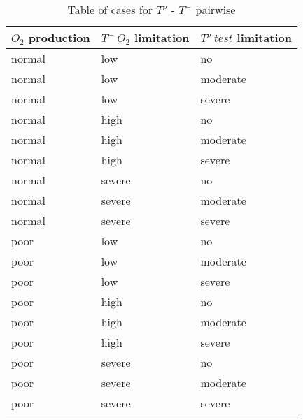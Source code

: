 \begin{table}
  \centering
  \begin{tabular}{|l|l|l|}
    \hline
    \textbf{$O_2$ production} & \textbf{$T^-\ O_2$ limitation} & \textbf{$T^p\ test$ limitation}\\ \hline
    normal & low & no \\ \hline
    normal & low & moderate \\ \hline
    normal & low & severe \\ \hline
    normal & high & no \\ \hline
    normal & high & moderate \\ \hline
    normal & high & severe \\ \hline
    normal & severe & no \\ \hline
    normal & severe & moderate \\ \hline
    normal & severe & severe \\ \hline
    poor & low & no \\ \hline
    poor & low & moderate \\ \hline
    poor & low & severe \\ \hline
    poor & high & no \\ \hline
    poor & high & moderate \\ \hline
    poor & high & severe \\ \hline
    poor & severe & no \\ \hline
    poor & severe & moderate \\ \hline
    poor & severe & severe \\ \hline
  \end{tabular}
  \caption{Table of cases for $T^p$ - $T^-$ pairwise}
  \label{tab_Tpro-Tneg_cases}
\end{table}

\newpage

